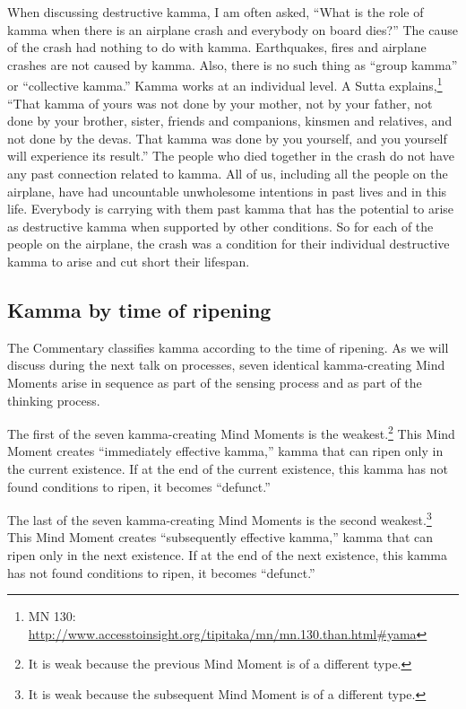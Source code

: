 When discussing destructive kamma, I am often asked, “What is the role of kamma when there is an airplane crash and everybody on board dies?” The cause of the crash had nothing to do with kamma. Earthquakes, fires and airplane crashes are not caused by kamma. Also, there is no such thing as “group kamma” or “collective kamma.” Kamma works at an individual level. A Sutta explains,\footnote{MN 130: \url{http://www.accesstoinsight.org/tipitaka/mn/mn.130.than.html\#yama}} “That kamma of yours was not done by your mother, not by your father, not done by your brother, sister, friends and companions, kinsmen and relatives, and not done by the devas. That kamma was done by you yourself, and you yourself will experience its result.” The people who died together in the crash do not have any past connection related to kamma. All of us, including all the people on the airplane, have had uncountable unwholesome intentions in past lives and in this life. Everybody is carrying with them past kamma that has the potential to arise as destructive kamma when supported by other conditions. So for each of the people on the airplane, the crash was a condition for their individual destructive kamma to arise and cut short their lifespan.

\subsection*{Kamma by time of ripening}

The Commentary classifies kamma according to the time of ripening. As we will discuss during the next talk on processes, seven identical kamma-creating Mind Moments arise in sequence as part of the sensing process and as part of the thinking process.

The first of the seven kamma-creating Mind Moments is the weakest.\footnote{It is weak because the previous Mind Moment is of a different type.} This Mind Moment creates “immediately effective kamma,” kamma that can ripen only in the current existence. If at the end of the current existence, this kamma has not found conditions to ripen, it becomes “defunct.”

The last of the seven kamma-creating Mind Moments is the second weakest.\footnote{It is weak because the subsequent Mind Moment is of a different type.} This Mind Moment creates “subsequently effective kamma,” kamma that can ripen only in the next existence. If at the end of the next existence, this kamma has not found conditions to ripen, it becomes “defunct.”

